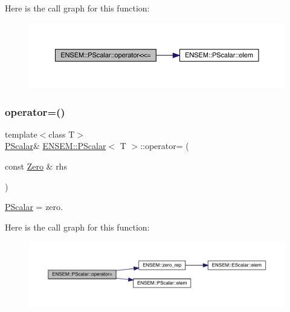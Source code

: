 Here is the call graph for this function\+:
\nopagebreak
\begin{figure}[H]
\begin{center}
\leavevmode
\includegraphics[width=350pt]{d3/d27/classENSEM_1_1PScalar_ade643675ab6ef041676e1098ac740b29_cgraph}
\end{center}
\end{figure}
\mbox{\label{classENSEM_1_1PScalar_a4357d579e24371f6384da9008f4512b3}} 
\subsubsection{\texorpdfstring{operator=()}{operator=()}\hspace{0.1cm}{\footnotesize\ttfamily [1/4]}}
{\footnotesize\ttfamily template$<$class T$>$ \\
\mbox{\hyperlink{classENSEM_1_1PScalar}{P\+Scalar}}\& \mbox{\hyperlink{classENSEM_1_1PScalar}{E\+N\+S\+E\+M\+::\+P\+Scalar}}$<$ T $>$\+::operator= (\begin{DoxyParamCaption}\item[{const \mbox{\hyperlink{structENSEM_1_1Zero}{Zero}} \&}]{rhs }\end{DoxyParamCaption})\hspace{0.3cm}{\ttfamily [inline]}}



\mbox{\hyperlink{classENSEM_1_1PScalar}{P\+Scalar}} = zero. 

Here is the call graph for this function\+:
\nopagebreak
\begin{figure}[H]
\begin{center}
\leavevmode
\includegraphics[width=350pt]{d3/d27/classENSEM_1_1PScalar_a4357d579e24371f6384da9008f4512b3_cgraph}
\end{center}
\end{figure}
\mbox{\label{classENSEM_1_1PScalar_a4357d579e24371f6384da9008f4512b3}} 
